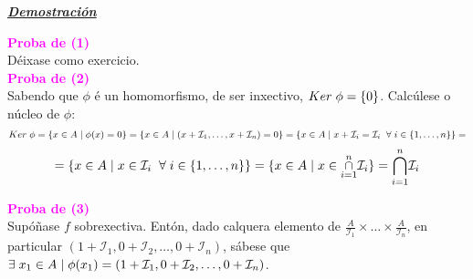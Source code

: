 \documentclass[twoside]{report}
\newcommand{\magbf}[1]{\textcolor{magenta}{\textbf{#1}}} %
\theoremstyle{mystyle}
\begin{document}
\vspace{2mm}

\noindent \textbf{\textit{\underline{Demostración}}}

\vspace{2mm}

\noindent \magbf{Proba de (1)}\\ 

\noindent Déixase como exercicio.\\

\noindent \magbf{Proba de (2)}\\ 

\noindent Sabendo que $\phi$ é un homomorfismo, de ser inxectivo, $Ker \hspace{1mm} \phi = \{0\}$. Calcúlese o núcleo de $\phi$:
$$Ker \hspace{1mm} \phi = \{x \in A \hspace{1mm} | \hspace{1mm} \phi(x) = 0\} = \{ x \in A \hspace{1mm} | \hspace{1mm} (x + \mathcal{I}_{1}, \ldots, x + \mathcal{I}_{n}) = 0\} = \{ x \in A \hspace{1mm} | \hspace{1mm} x + \mathcal{I}_{i} = \mathcal{I}_{i} \hspace{2mm} \forall \hspace{1mm} i \in \{1, \ldots, n\}\} = $$
$$= \{x \in A \hspace{1mm} | \hspace{1mm} x \in \mathcal{I}_{i} \hspace{2mm} \forall \hspace{1mm} i \in \{1, \ldots, n\}\} = \{x \in A \hspace{1mm} | \hspace{1mm} x \in \overset{n}{\underset{i = 1}{\cap}}\mathcal{I}_{i}\} = \overset{n}{\underset{i = 1}{\bigcap}}\mathcal{I}_{i}$$

\noindent \magbf{Proba de (3)}\\

\noindent {} Supóñase $f$ sobrexectiva. Entón, dado calquera elemento de $\displaystyle \frac{A}{\mathcal{I}_{1}} \times \ldots \times \displaystyle \frac{A}{\mathcal{I}_{n}}$, en particular $(1 + \mathcal{I}_{1}, 0 + \mathcal{I}_{2}, \ldots, 0 + \mathcal{I}_{n})$, sábese que $\exists \hspace{1mm} x_{1} \in A \hspace{1mm} | \hspace{1mm} \phi(x_{1}) = (1 + \mathcal{I}_{1}, 0 + \mathcal{I}_{2}, \ldots, 0 + \mathcal{I}_{n})$.\\
\end{document}
